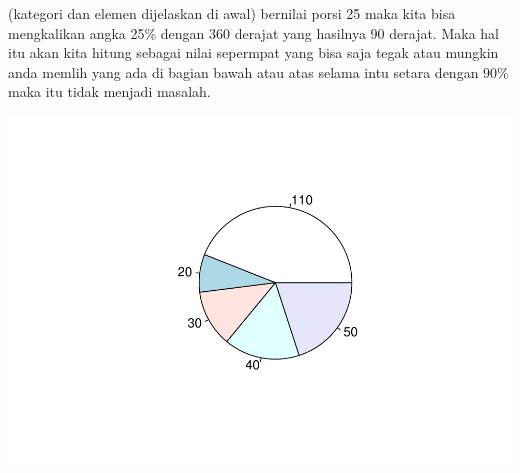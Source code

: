 \documentclass[
]{book}
\newenvironment{Shaded}{\begin{snugshade}}{\end{snugshade}}
\newcommand{\AttributeTok}[1]{\textcolor[rgb]{0.13,0.29,0.53}{#1}}
\newcommand{\CommentTok}[1]{\textcolor[rgb]{0.56,0.35,0.01}{\textit{#1}}}
\newcommand{\DecValTok}[1]{\textcolor[rgb]{0.00,0.00,0.81}{#1}}
\newcommand{\FloatTok}[1]{\textcolor[rgb]{0.00,0.00,0.81}{#1}}
\newcommand{\FunctionTok}[1]{\textcolor[rgb]{0.13,0.29,0.53}{\textbf{#1}}}
\newcommand{\NormalTok}[1]{#1}
\newcommand{\SpecialCharTok}[1]{\textcolor[rgb]{0.81,0.36,0.00}{\textbf{#1}}}
\newcommand{\StringTok}[1]{\textcolor[rgb]{0.31,0.60,0.02}{#1}}
\theoremstyle{definition}
\theoremstyle{definition}
\theoremstyle{definition}
\theoremstyle{definition}
\theoremstyle{remark}
\begin{document}
(kategori dan elemen dijelaskan di awal) bernilai porsi 25 maka kita bisa mengkalikan angka 25\% dengan 360 derajat yang hasilnya 90 derajat. Maka hal itu akan kita hitung sebagai nilai sepermpat yang bisa saja tegak atau mungkin anda memlih yang ada di bagian bawah atau atas selama intu setara dengan 90\% maka itu tidak menjadi masalah.

\begin{Shaded}
\end{Shaded}

\includegraphics{_main_files/figure-latex/unnamed-chunk-13-1.pdf}

\begin{Shaded}
\end{Shaded}
\end{document}
